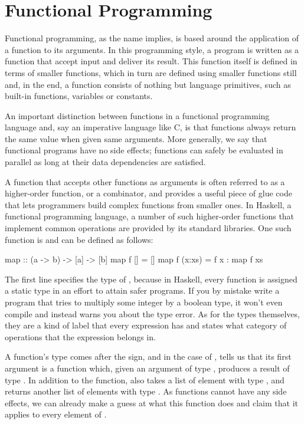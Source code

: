 \documentclass[../main.tex]{subfiles}
\begin{document}
\section{Functional Programming}
\label{functional}

Functional programming, as the name implies, is based around the application of a function to its arguments. In this programming style, a program is written as a function that accept input and deliver its result. This function itself is defined in terms of smaller functions, which in turn are defined using smaller functions still and, in the end, a function consists of nothing but language primitives, such as built-in functions, variables or constants.

An important distinction between functions in a functional programming language and, say an imperative language like C, is that functions always return the same value when given same arguments. More generally, we say that functional programs have no side effects; functions can safely be evaluated in parallel as long at their data dependencies are satisfied.

A function that accepts other functions as arguments is often referred to as a higher-order function, or a combinator, and provides a useful piece of glue code that lets programmers build complex functions from smaller ones. In Haskell, a functional programming language, a number of such higher-order functions that implement common operations are provided by its standard libraries. One such function is  and can be defined as follows:

\begin{code}
map :: (a -> b) -> [a] -> [b]
map f []     = []
map f (x:xs) = f x : map f xs
\end{code}

The first line specifies the type of , because in Haskell, every function is assigned a static type in an effort to attain safer programs. If you by mistake write a program that tries to multiply some integer by a boolean type, it won't even compile and instead warns you about the type error. As for the types themselves, they are a kind of label that every expression has and states what category of operations that the expression belongs in.

A function's type comes after the \codei{::} sign, and in the case of , tells us that its first argument is a function  which, given an argument of type , produces a result of type . In addition to the function,  also takes a list  of element with type , and returns another list of elements with type . As functions cannot have any side effects, we can already make a guess at what this function does and claim that it applies  to every element of .
\end{document}
